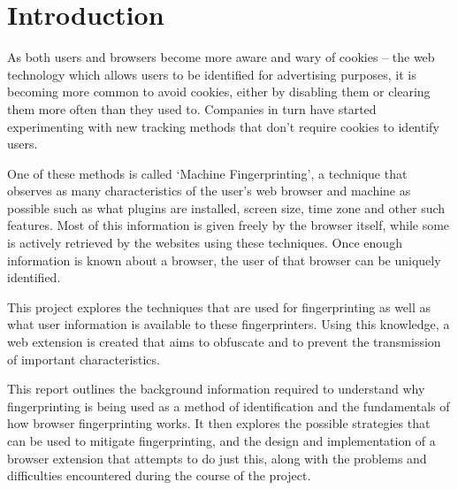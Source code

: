\chapter{Introduction}

As both users and browsers become more aware and wary of cookies -- the web technology which allows users to be identified for advertising purposes, it is becoming more common to avoid cookies, either by disabling them or clearing them more often than they used to.
Companies in turn have started experimenting with new tracking methods that don't require cookies to identify users.

One of these methods is called `Machine Fingerprinting', a technique that observes as many characteristics of the user's web browser and machine as possible such as what plugins are installed, screen size, time zone and other such features.
Most of this information is given freely by the browser itself, while some is actively retrieved by the websites using these techniques.
Once enough information is known about a browser, the user of that browser can be uniquely identified.

This project explores the techniques that are used for fingerprinting as well as what user information is available to these fingerprinters. Using this knowledge, a web extension is created that aims to obfuscate and to prevent the transmission of important characteristics.

This report outlines the background information required to understand why fingerprinting is being used as a method of identification and the fundamentals of how browser fingerprinting works.
It then explores the possible strategies that can be used to mitigate fingerprinting, and the design and implementation of a browser extension that attempts to do just this, along with the problems and difficulties encountered during the course of the project.

